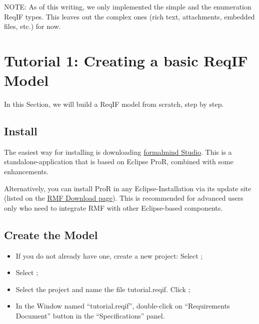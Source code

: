 NOTE: As of this writing, we only implemented the simple and the enumeration ReqIF types.  This leaves out the complex ones (rich text, attachments, embedded files, etc.) for now.

\section{Tutorial 1: Creating a basic ReqIF Model}

In this Section, we will build a ReqIF model from scratch, step by step.

\subsection{Install \pror{}}

The easiest way for installing \pror{} is downloading \href{http://formalmind.com/studio}{formalmind Studio}.  This is a standalone-application that is based on Eclipse ProR, combined with some enhancements.

 Alternatively, you can install ProR in any Eclipse-Installation via its update site (listed on the \href{https://www.eclipse.org/rmf/download.php}{RMF Download page}).  This is recommended for advanced users only who need to integrate RMF with other Eclipse-based components.

\subsection{Create the Model}

\begin{itemize}

\item
  If you do not already have one, create a new project: Select  ;
\item
  Select ;
\item
  Select the project and name the file tutorial.reqif.  Click ;
\item
  In the Window named ``tutorial.reqif'', double-click on ``Requirements
  Document'' button in the ``Specifications'' panel.
\end{itemize}

